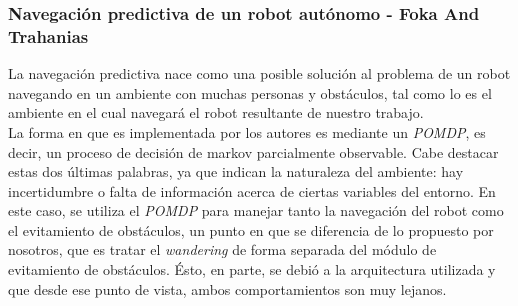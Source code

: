 \subsubsection{Navegaci\'on predictiva de un robot aut\'onomo - Foka And Trahanias \cite{Foka02predictiveautonomous}}
La navegaci\'on predictiva nace como una posible soluci\'on al problema de un robot navegando en un ambiente
con muchas personas y obst\'aculos, tal como lo es el ambiente en el cual navegar\'a el robot resultante
de nuestro trabajo.
\\
La forma en que es implementada por los autores es mediante un \emph{POMDP}, es decir, 
un proceso de decisi\'on de markov parcialmente observable. Cabe destacar estas dos \'ultimas palabras, ya
que indican la naturaleza del ambiente: hay incertidumbre o falta de informaci\'on acerca de ciertas variables
del entorno. En este caso, se utiliza el \emph{POMDP} para manejar tanto la navegaci\'on del robot como el
evitamiento de obst\'aculos, un punto en que se diferencia de lo propuesto por nosotros, que es tratar el
\emph{wandering} de forma separada del m\'odulo de evitamiento de obst\'aculos. \'Esto, en parte, se debi\'o
a la arquitectura utilizada y que desde ese punto de vista, ambos comportamientos son muy lejanos.

